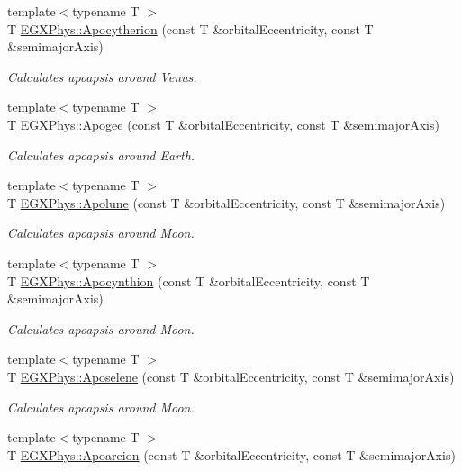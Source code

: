 \begin{DoxyCompactItemize}
{\footnotesize template$<$typename T $>$ }\\T \hyperlink{group___astrophysics_ga59a284bb0bc11848c5b9ef1283033425}{E\+G\+X\+Phys\+::\+Apocytherion} (const T \&orbital\+Eccentricity, const T \&semimajor\+Axis)
\begin{DoxyCompactList}\small\item\em Calculates apoapsis around Venus. \end{DoxyCompactList}\item 
{\footnotesize template$<$typename T $>$ }\\T \hyperlink{group___astrophysics_ga5cf587a051db28cae9e028a2b4955b0d}{E\+G\+X\+Phys\+::\+Apogee} (const T \&orbital\+Eccentricity, const T \&semimajor\+Axis)
\begin{DoxyCompactList}\small\item\em Calculates apoapsis around Earth. \end{DoxyCompactList}\item 
{\footnotesize template$<$typename T $>$ }\\T \hyperlink{group___astrophysics_gacc68b49812c38394611e1ef3a8bf0e3e}{E\+G\+X\+Phys\+::\+Apolune} (const T \&orbital\+Eccentricity, const T \&semimajor\+Axis)
\begin{DoxyCompactList}\small\item\em Calculates apoapsis around Moon. \end{DoxyCompactList}\item 
{\footnotesize template$<$typename T $>$ }\\T \hyperlink{group___astrophysics_ga557bb4d1a0ce7f17aaa8f8de469d4f52}{E\+G\+X\+Phys\+::\+Apocynthion} (const T \&orbital\+Eccentricity, const T \&semimajor\+Axis)
\begin{DoxyCompactList}\small\item\em Calculates apoapsis around Moon. \end{DoxyCompactList}\item 
{\footnotesize template$<$typename T $>$ }\\T \hyperlink{group___astrophysics_gab61f3b2d6a5be3f62f5fb6dfdf802014}{E\+G\+X\+Phys\+::\+Aposelene} (const T \&orbital\+Eccentricity, const T \&semimajor\+Axis)
\begin{DoxyCompactList}\small\item\em Calculates apoapsis around Moon. \end{DoxyCompactList}\item 
{\footnotesize template$<$typename T $>$ }\\T \hyperlink{group___astrophysics_ga8d8ac5814f653e229e1d463b432ffca5}{E\+G\+X\+Phys\+::\+Apoareion} (const T \&orbital\+Eccentricity, const T \&semimajor\+Axis)

\end{DoxyCompactItemize}
